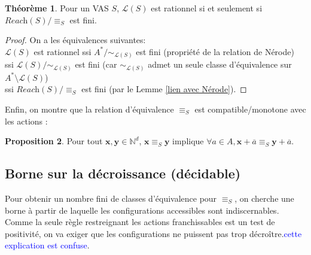\documentclass[a4paper,final]{article}
\theoremstyle{definition}
\newtheorem{Theorem}{Théorème}
\newtheorem{Proposition}[Theorem]{Proposition}
\newtheorem*{Remark}{Remarque}
\newcommand{\alain}[1]{\textcolor{blue}{#1}}
\newcommand{\N}{\ensuremath{\mathbb{N}}}
\newcommand{\lang}{\ensuremath{\mathcal{L}}}
\newcommand{\reach}{\ensuremath{\textit{Reach}}}
\newcommand{\vect}[1]{\ensuremath{\mathbf{#1}}}
\newcommand{\rel}{\ensuremath{\equiv}}
\newcommand{\relGY}{\ensuremath{\equiv^\text{GY}_S}}
\newcommand{\valeur}[1]{\ensuremath{\overline{#1}}}
\begin{document}
\begin{Theorem}\label{lien relation-rationnel}
    Pour un VAS $S$, $\lang(S)$ est rationnel si et seulement si $\reach(S)/\rel_S$ est fini.
\end{Theorem}

\begin{proof}
On a les équivalences suivantes: \\
$\lang(S)$ est rationnel 
ssi $A^\ast/\sim_{\lang(S)}$ est fini (propriété de la relation de Nérode) \\
ssi $\lang(S)/\sim_{\lang(S)}$ est fini (car $\sim_{\lang(S)}$ admet un seule classe d'équivalence sur $A^\ast \setminus \lang(S)$) \\
ssi $\reach(S)/\rel_S$ est fini (par le Lemme \ref{lien avec Nérode}).
\end{proof}

Enfin, on montre que
la relation d'équivalence $\rel_S$ 
est compatible/monotone avec les actions :

\begin{Proposition}\label{Monotonie relation}
Pour tout $\vect{x},\vect{y} \in\N^d$, $\vect{x}\rel_S \vect{y}$ implique $\forall a\in A, \vect{x} +\valeur{a} \rel_S \vect{y} +\valeur{a}$.
\end{Proposition}
%


\subsection{Borne sur la décroissance (décidable)}

Pour obtenir un nombre fini de classes d'équivalence pour $\rel_S$, on cherche une borne à partir de laquelle les configurations accessibles sont indiscernables.
Comme la seule règle restreignant les actions franchissables est un test de positivité, on va exiger que les configurations ne puissent pas trop décroître.\alain{cette explication est confuse}.

\end{document}
